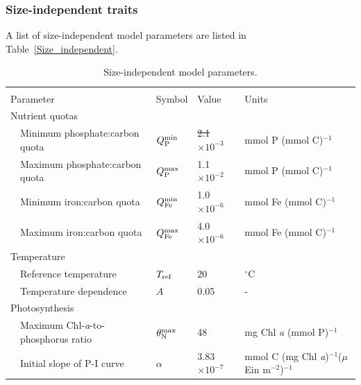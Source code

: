\documentclass[gmd, manuscript]{copernicus}
\providecommand{\DIFadd}[1]{{\protect\color{blue}\uwave{#1}}} %
\providecommand{\DIFdel}[1]{{\protect\color{red}\sout{#1}}}                      %
\providecommand{\DIFaddFL}[1]{\DIFadd{#1}} %
\providecommand{\DIFdelFL}[1]{\DIFdel{#1}} %
\providecommand{\DIFaddbeginFL}{} %
\providecommand{\DIFaddendFL}{} %
\providecommand{\DIFdelbeginFL}{} %
\providecommand{\DIFdelendFL}{} %
\begin{document}
\subsubsection{Size-independent traits}\label{size_ind_traits}

A list of size-independent model parameters are listed in Table~\ref{Size_independent}.

\begin{table}[htp!]
\footnotesize
\caption{Size-independent model parameters.}
\begin{tabular*}{1.0\textwidth}{@{\extracolsep{\fill}}lllll}
\hline \\ [-2ex]
\multicolumn{2}{l}{{Parameter}} &{Symbol} & {Value} & {Units} \\ [+2ex]
\multicolumn{5}{l}{{Nutrient quotas}} \\ 
& Minimum phosphate:carbon quota & $Q^{\rm min}_{\rm P}$ & \DIFdelbeginFL \DIFdelFL{2.1}\DIFdelendFL \DIFaddbeginFL \DIFaddFL{3.3}\DIFaddendFL $\times10^{-3}$ & mmol P (mmol C)$^{-1}$ \\ 
& Maximum phosphate:carbon quota & $Q^{\rm max}_{\rm P}$ & 1.1$\times10^{-2}$ & mmol P (mmol C)$^{-1}$ \\ 
& Minimum iron:carbon quota & $Q^{\rm min}_{\rm Fe}$ & 1.0$\times10^{-6}$ & mmol Fe (mmol C)$^{-1}$ \\ 
& Maximum iron:carbon quota & $Q^{\rm max}_{\rm Fe}$ & 4.0$\times10^{-6}$ & mmol Fe (mmol C)$^{-1}$ \\ 
\multicolumn{5}{l}{{Temperature}} \\ 
& Reference temperature & $T_{\rm ref}$ & 20 & $^\circ$C \\ 
& Temperature dependence & $A$ & 0.05 & - \\ 
\multicolumn{5}{l}{{Photosynthesis}} \\ 
& Maximum Chl-\textit{a}-to-phosphorus ratio & $\theta^{\rm max}_{\rm N}$ & 48 & mg Chl \textit{a} (mmol P)$^{-1}$ \\ 
& Initial slope of P-I curve & $\alpha$ & 3.83$\times10^{-7}$ & mmol C (mg Chl \textit{a})$^{-1}$($\mu$Ein m$^{-2}$)$^{-1}$ \\ 

\end{tabular*}
\end{table}
\end{document}
